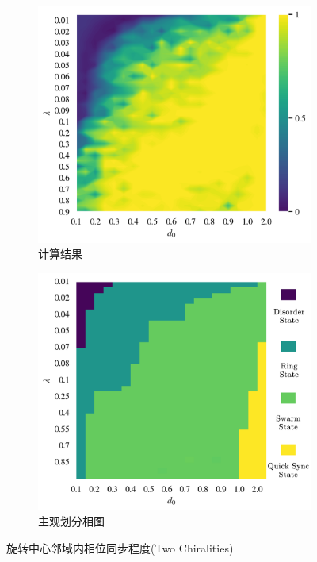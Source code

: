 \documentclass{article}
\begin{document}
\vspace{-0.5cm}
\begin{figure}[H]
	\centering
	\begin{subfigure}[b]{0.49\textwidth}
		\includegraphics[width=\textwidth]{./figs/limitDisPhaseSync.png}
		\vspace{-1cm}
		\caption{计算结果}
	\end{subfigure}
	\begin{subfigure}[b]{0.49\textwidth}
		\includegraphics[width=\textwidth]{./figs/subjectiveOp2.png}
		\vspace{-1cm}
		\caption{主观划分相图}
	\end{subfigure}
	\vspace{-0.5cm}
	\caption{旋转中心邻域内相位同步程度(Two Chiralities)}
	\label{fig:fig234c.5.1}
\end{figure}
\end{document}
